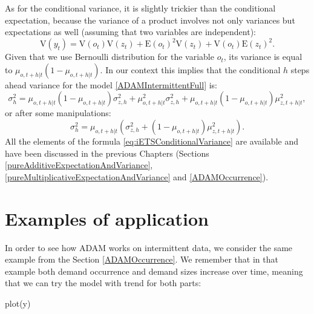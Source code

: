 \documentclass[
]{book}
\newenvironment{Shaded}{\begin{snugshade}}{\end{snugshade}}
\newcommand{\FunctionTok}[1]{\textcolor[rgb]{0.00,0.00,0.00}{#1}}
\newcommand{\NormalTok}[1]{#1}
\theoremstyle{definition}
\theoremstyle{definition}
\theoremstyle{definition}
\theoremstyle{definition}
\theoremstyle{remark}
\begin{document}
As for the conditional variance, it is slightly trickier than the conditional expectation, because the variance of a product involves not only variances but expectations as well (assuming that two variables are independent):
\begin{equation}
     \mathrm{V}(y_t) = \mathrm{V}(o_t) \mathrm{V}(z_t) + \mathrm{E}(o_t)^2 \mathrm{V}(z_t) + \mathrm{V}(o_t) \mathrm{E}(z_t)^2 .
    \label{eq:VarianceOfProduct}
\end{equation}
Given that we use Bernoulli distribution for the variable \(o_t\), its variance is equal to \(\mu_{o,t+h|t} (1-\mu_{o,t+h|t})\). In our context this implies that the conditional \(h\) steps ahead variance for the model \ref{ADAMIntermittentFull} is:
\begin{equation}
     \sigma^2_h = \mu_{o,t+h|t} (1-\mu_{o,t+h|t}) \sigma^2_{z,h} + \mu_{o,t+h|t}^2 \sigma^2_{z,h} + \mu_{o,t+h|t} (1-\mu_{o,t+h|t}) \mu_{z,t+h|t}^2 ,
    \label{eq:iETSConditionalVariance01}
\end{equation}
or after some manipulations:
\begin{equation}
     \sigma^2_h = \mu_{o,t+h|t} \left(\sigma^2_{z,h} + (1 - \mu_{o,t+h|t}) \mu_{z,t+h|t}^2 \right).
    \label{eq:iETSConditionalVariance}
\end{equation}
All the elements of the formula \eqref{eq:iETSConditionalVariance} are available and have been discussed in the previous Chapters (Sections \ref{pureAdditiveExpectationAndVariance}, \ref{pureMultiplicativeExpectationAndVariance} and \ref{ADAMOccurrence}).

\hypertarget{IntermittentExample}{%
\section{Examples of application}\label{IntermittentExample}}

In order to see how ADAM works on intermittent data, we consider the same example from the Section \ref{ADAMOccurrence}. We remember that in that example both demand occurrence and demand sizes increase over time, meaning that we can try the model with trend for both parts:

\begin{Shaded}
\begin{Highlighting}[]
\FunctionTok{plot}\NormalTok{(y)}
\end{Highlighting}
\end{Shaded}
\end{document}
